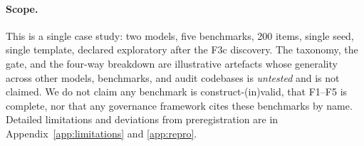 \paragraph{Scope.} This is a single case study: two models, five
benchmarks, 200 items, single seed, single template, declared
exploratory after the F3c discovery. The taxonomy, the gate, and
the four-way breakdown are illustrative artefacts whose generality
across other models, benchmarks, and audit codebases is
\emph{untested} and is not claimed. We do not claim any benchmark
is construct-(in)valid, that F1--F5 is complete, nor that any
governance framework cites these benchmarks by name. Detailed
limitations and deviations from preregistration are in
Appendix~\ref{app:limitations} and \ref{app:repro}.
